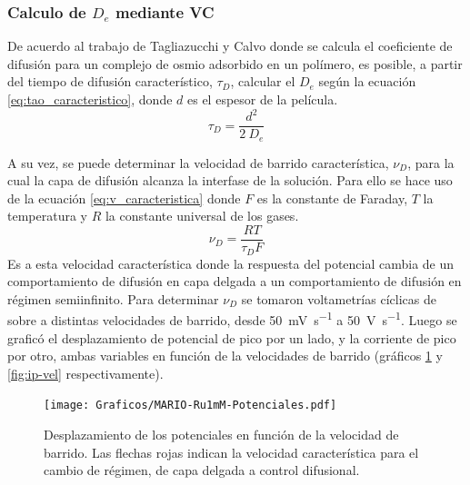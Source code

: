 	 \subsubsection*{Calculo de $D_e$ mediante VC}	
	 
	   	 De acuerdo al trabajo de Tagliazucchi y Calvo\cite{Tagliazucchi2010a} donde se calcula el coeficiente de difusión para un complejo de osmio adsorbido en un polímero, es posible, a partir del tiempo de difusión característico, $\tau_{\scriptscriptstyle{D}}$, calcular el $D_e$ según la ecuación \ref{eq:tao_caracteristico}, donde $d$ es el espesor de la película. 
	   		\begin{equation}
					\tau_{\scriptscriptstyle{D}}=\frac{d^2}{2\ D_e}
					\label{eq:tao_caracteristico}
			 \end{equation} 
  	  	  
  	  	  A su vez, se puede determinar la  velocidad de barrido característica, $\nu_{\scriptscriptstyle{D}}$, para la cual la capa de difusión alcanza la interfase de la solución. Para ello se hace uso de la ecuación \ref{eq:v_caracteristica} donde $F$ es la constante de Faraday, $T$ la temperatura y $R$ la constante universal de los gases.
	  	   	 \begin{equation}
					\nu_{\scriptscriptstyle{D}}=\frac{RT}{\tau_{\scriptscriptstyle{D}}F}
					\label{eq:v_caracteristica}
			 \end{equation}
	     \indent Es a esta velocidad característica donde la respuesta del potencial cambia de un comportamiento de difusión en capa delgada a un comportamiento de difusión en régimen semiinfinito. Para determinar $\nu_{\scriptscriptstyle{D}}$ se tomaron voltametrías cíclicas de \ru\space sobre \pdmF\space a distintas velocidades de barrido, desde \SI{50}{\milli\volt\per\second} a \SI{50}{\volt\per\second}. Luego se graficó el desplazamiento de potencial de pico por un lado, y la corriente de pico por otro, ambas variables en función de la velocidades de barrido (gráficos \ref{fig:corrimiento-potenciales} y \ref{fig:ip-vel} respectivamente).
	   			
			 \begin{figure}[b!]
					\centering
			 	    \texttt{[image: Graficos/MARIO-Ru1mM-Potenciales.pdf]}
			        \caption[Desplazamiento de potenciales]{Desplazamiento de los potenciales en función de la velocidad de barrido. Las flechas rojas indican la velocidad característica para el cambio de régimen, de capa delgada a control difusional.}
			        \label{fig:corrimiento-potenciales}
			      	\end{figure}
         
